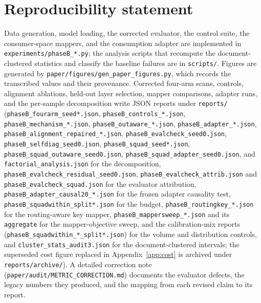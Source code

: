 \documentclass[11pt]{article}
\begin{document}
\section{Reproducibility statement}
\begin{sloppypar}
Data generation, model loading, the corrected evaluator, the control suite, the
consumer-space mappers, and the consumption adapter are implemented in
\texttt{experiments/phaseB\_*.py}; the analysis scripts that recompute the
document-clustered statistics and classify the baseline failures are in
\texttt{scripts/}. Figures are generated by
\texttt{paper/figures/gen\_paper\_figures.py}, which records the transcribed
values and their provenance. Corrected four-arm scans, controls, alignment
ablations, held-out layer selection, mapper comparisons, adapter runs, and the
per-sample decomposition write JSON reports under \texttt{reports/}
(\texttt{phaseB\_fourarm\_seed*.json},
\texttt{phaseB\_controls\_*.json},
\texttt{phaseB\_mechanism\_*.json},
\texttt{phaseB\_outaware\_*.json},
\texttt{phaseB\_adapter\_*.json},
\texttt{phaseB\_alignment\_repaired\_*.json},
\texttt{phaseB\_evalcheck\_seed0.json},
\texttt{phaseB\_selfdiag\_seed0.json},
\texttt{phaseB\_squad\_seed*.json},
\texttt{phaseB\_squad\_outaware\_seed0.json},
\texttt{phaseB\_squad\_adapter\_seed0.json}, and
\texttt{factorial\_analysis.json} for the decomposition,
\texttt{phaseB\_evalcheck\_residual\_seed0.json},
\texttt{phaseB\_evalcheck\_attrib.json} and
\texttt{phaseB\_evalcheck\_squad.json} for the evaluator attribution,
\texttt{phaseB\_adapter\_causal20\_*.json} for the frozen
adapter causality test, \texttt{phaseB\_squadwithin\_split*.json} for the
budget, \texttt{phaseB\_routingkey\_*.json} for the routing-aware key mapper,
\texttt{phaseB\_mappersweep\_*.json} and its \texttt{aggregate} for the
mapper-objective sweep, and the calibration-mix reports
(\texttt{phaseB\_squadwithin\_*\_split*.json}) for the volume and distribution
controls, and
\texttt{cluster\_stats\_audit3.json} for the document-clustered
intervals; the superseded cost figure replaced in Appendix~\ref{app:cost} is
archived under \texttt{reports/archive/}). A
detailed correction note (\texttt{paper/audit/METRIC\_CORRECTION.md}) documents
the evaluator defects, the legacy numbers they produced, and the mapping from
each revised claim to its report.
\end{sloppypar}
\end{document}
